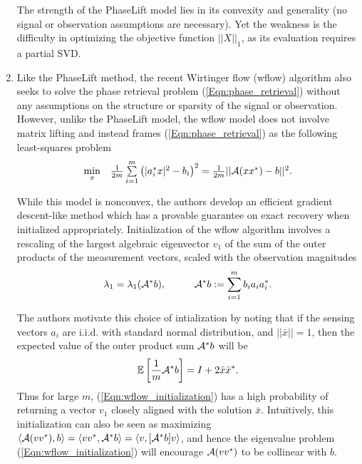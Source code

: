 \begin{enumerate}
The strength of the PhaseLift model lies in its convexity and generality (no signal or observation assumptions are necessary).  Yet the weakness is the difficulty in optimizing the objective function $||X||_1$, as its evaluation requires a partial SVD.


\item

Like the PhaseLift method, the recent Wirtinger flow (wflow) algorithm \cite{DBLP:journals/tit/CandesLS15} also seeks to solve the phase retrieval problem (\ref{Eqn:phase_retrieval}) without any assumptions on the structure or sparsity of the signal or observation.  However, unlike the PhaseLift model, the wflow model does not involve matrix lifting and instead frames (\ref{Eqn:phase_retrieval}) as the following least-squares problem
\begin{equation} 				\label{Eqn:wflow_least-squares}
\begin{array}{ll}
	\min\limits_{\substack{x}}
		&	\frac{1}{2m} \sum\limits_{\substack{i=1}}^{\substack{m}} \left( |a_i^*x|^2 - b_i \right)^2
			= \frac{1}{2m} || {\mathcal A}(xx^*) - b||^2.
\end{array}
\end{equation}


While this model is nonconvex, the authors develop an efficient gradient descent-like method which has a provable guarantee on exact recovery when initialized appropriately.  Initialization of the wflow algorithm involves a rescaling of the largest algebraic eigenvector $v_1$ of the sum of the outer products of the measurement vectors, scaled with the observation magnitudes
\begin{equation}			\label{Eqn:wflow_initialization}
\lambda_1 = \lambda_1({\mathcal A}^* b),  \hspace{1cm} {\mathcal A}^*b := \sum\limits_{\substack{i=1}}^{\substack{m}}b_i a_i a_i^*.
\end{equation}


The authors motivate this choice of intialization by noting that if the sensing vectors $a_i$ are i.i.d. with standard normal distribution, and $||\bar{x}|| = 1$, then the expected value of the outer product sum ${\mathcal A}^*b$ will be
\begin{equation} 		\label{Eqn:wflow_expected_value}
{\mathbb E} \left[ \frac{1}{m}{\mathcal A}^* b \right] = I + 2\bar{x}\bar{x}^*.
\end{equation}
Thus for large $m$, (\ref{Eqn:wflow_initialization}) has a high probability of returning a vector $v_1$ closely aligned with the solution $\bar{x}$. Intuitively, this initialization can also be seen as maximizing $\langle {\mathcal A}(vv^*), b \rangle	= \langle v v^*, {\mathcal A}^* b \rangle = \langle v, [{\mathcal A}^* b] v \rangle$, and hence the eigenvalue problem (\ref{Eqn:wflow_initialization}) will encourage ${\mathcal A}(vv^*)$ to be collinear with $b$.


\end{enumerate}
